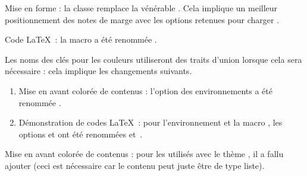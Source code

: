 \documentclass{tutodoc}
\begin{document}
\begin{tdocbreak}
	\item Mise en forme : la classe  remplace la vénérable . Cela implique un meilleur positionnement des notes de marge avec les options retenues pour charger .

	\item Code \LaTeX\ : la macro  a été renommée .

	\item Les noms des clés pour les couleurs utiliseront des traits d'union lorsque cela sera nécessaire : cela implique les changements suivants.
	\begin{enumerate}
		\item Mise en avant colorée de contenus : l'option  des environnements a été renommée .

		\item Démonstration de codes \LaTeX\ : pour l'environnement  et la macro , les options  et  ont été renommées  et \,.
	\end{enumerate}
\end{tdocbreak}


\begin{tdocfix}
	\item Mise en avant colorée de contenus : pour les  utilisés avec le thème , il a fallu ajouter  (ceci est nécessaire car le contenu peut juste être de type liste).
\end{tdocfix}
\end{document}
